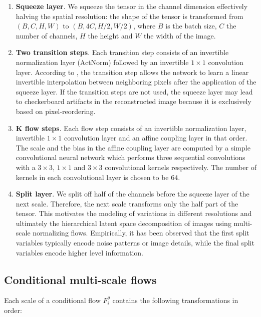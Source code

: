 \begin{enumerate}
    \item \textbf{Squeeze layer}. We squeeze the tensor in the channel dimension effectively halving the spatial resolution: the shape of the tensor is transformed from $(B, C, H, W)$ to $(B, 4C, H/2, W/2)$, where $B$ is the batch size, $C$ the number of channels, $H$ the height and $W$ the width of the image.
    \item \textbf{Two transition steps}. Each transition step consists of an invertible normalization layer (ActNorm) followed by an invertible $1\times 1$ convolution layer. According to \cite{SRFLOW}, the transition step allows the network to learn a linear invertible interpolation between neighboring pixels after the application of the squeeze layer. If the transition steps are not used, the squeeze layer may lead to checkerboard artifacts in the reconstructed image because it is exclusively based on pixel-reordering.
    \item \textbf{K flow steps}. Each flow step consists of an invertible normalization layer, invertible $1\times 1$ convolution layer and an affine coupling layer in that order. The scale and the bias in the affine coupling layer are computed by a simple convolutional neural network which performs three sequential convolutions with a $3\times 3$, $1\times 1$ and $3\times 3$ convolutional kernels respectively. The number of kernels in each convolutional layer is chosen to be $64$.
    \item \textbf{Split layer}. We split off half of the channels before the squeeze layer of the next scale. Therefore, the next scale transforms only the half part of the tensor. This motivates the modeling of variations in different resolutions and ultimately the hierarchical latent space decomposition of images using multi-scale normalizing flows. Empirically, it has been observed that the first split variables typically encode noise patterns or image details, while the final split variables encode higher level information.
    
\end{enumerate}
\newpage
\subsection{Conditional multi-scale flows}

Each scale of a conditional flow $F_i^{\theta}$ contains the following transformations in order:

